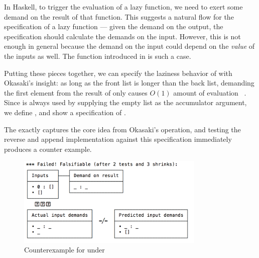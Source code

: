 \documentclass[acmsmall,review]{acmart}\settopmatter{}
\begin{document}
In Haskell, to trigger the evaluation of a lazy function, we need to
exert some demand on the result of that function. This suggests a
natural flow for the specification of a lazy function --- given the
demand on the output, the specification should calculate the demands
on the input. However, this is not enough in general because the
demand on the input could depend on the \textit{value} of the inputs
as well. The  function introduced in  is such
a case.

Putting these pieces together, we can specify the laziness behavior
of  with Okasaki's insight: as long as the front list is
longer than the back list, demanding the first element from the result
of  only causes $O(1)$ amount of evaluation
~\cite{Okasaki95simpleand}. Since  is always used by
supplying the empty list \lk{[]} as the accumulator argument, we
define , and show a specification
of .
%
%
The  exactly captures the core idea from Okasaki's 
operation, and testing the reverse and append implementation against this
specification immediately produces a counter example.
\begin{figure}[H]
\centering
\includegraphics[width=0.8\textwidth]{revappend_counterexample}
\caption{Counterexample for  under }
\end{figure}
\end{document}
